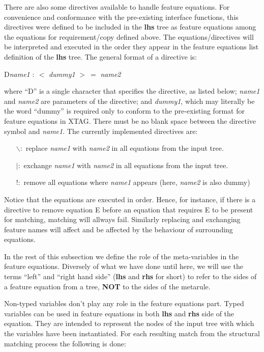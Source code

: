 There are also some directives available to handle feature equations. For 
convenience and conformance with the pre-existing interface functions,
this directives were defined to be included in the {\bf lhs} tree as feature 
equations among the equations for requirement/copy defined above. The
equations/directives will be interpreted and executed 
in the order they appear in the feature equations list definition 
of the {\bf lhs} tree. The general format of a directive is:

\centerline{D{\it{}name1} $:\ <$ {\it{}dummy1} $>\ =$ {\it{}name2}}

where ``D'' is a single character that specifies the directive, 
as listed below;
{\it name1} and {\it name2} are parameters of the directive; 
and {\it dummy1}, which may literally be the word ``dummy'' is required only
to conform to the pre-existing format for feature equations in XTAG.
There must be no blank space between the directive symbol and {\it name1}.
The currently implemented directives are:

\begin{itemize}
\item[$\backslash :$] replace {\it name1} with {\it name2} in all 
	equations from
	the input tree.
\item[{$|:$}] exchange {\it name1} with {\it name2} in all equations from
	the input tree.
\item[{$!:$}] remove all equations where {\it name1} appears 
	(here, {\it name2} is also dummy)
\end{itemize}

Notice that the equations are executed in order. Hence, for instance, if there
is a directive to remove equation E before an equation that requires E to
be present for matching, matching will allways fail. Similarly replacing and
exchanging feature names will affect and be affected by the behaviour of
surrounding equations. 

In the rest of this subsection we define the role of the meta-variables 
in the feature equations. Diversely of what we have done until here,
we will use the terms ``left'' and ``right hand
side'' ({\bf lhs} and {\bf rhs} for short) to refer to the sides of a
feature equation from a tree, {\bf NOT} to the sides of the metarule.

Non-typed variables don't play any role in the feature equations part.
Typed variables can be used in feature equations in both {\bf lhs} and 
{\bf rhs} side of the equation. 
They are intended to represent the nodes of the input tree with which
the variables have been instantiated. For each resulting match 
from the structural matching process the following is done:

